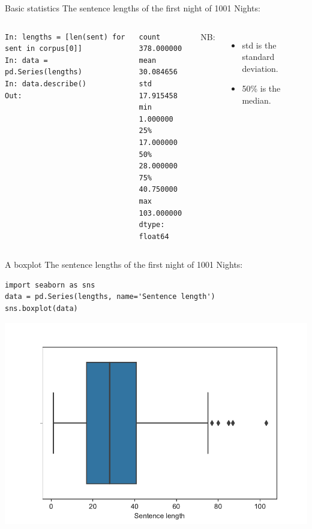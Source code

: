 \documentclass[aspectratio=169,usenames,dvipsnames]{beamer}
\begin{document}
\begin{frame}[fragile]{Basic statistics}
The sentence lengths of the first night of 1001 Nights:
\begin{columns}
\begin{lstlisting}
In: lengths = [len(sent) for sent in corpus[0]]
In: data = pd.Series(lengths)
In: data.describe()
Out:
\end{lstlisting}
\begin{lstlisting}[style=plain]
count    378.000000
mean      30.084656
std       17.915458
min        1.000000
25%       17.000000
50%       28.000000
75%       40.750000
max      103.000000
dtype: float64
\end{lstlisting}
    NB:
    \begin{itemize}
        \item std is the standard deviation.
        \item 50\% is the median.
    \end{itemize}
\end{columns}
\end{frame}


\begin{frame}[fragile]{A boxplot}
The sentence lengths of the first night of 1001 Nights:
\begin{lstlisting}
import seaborn as sns
data = pd.Series(lengths, name='Sentence length')
sns.boxplot(data)
\end{lstlisting}
\includegraphics[height=0.65\textheight]{fig/boxplotsents}
\end{frame}
\end{document}
